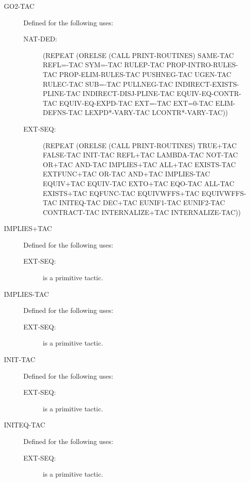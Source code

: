 \begin{description}
\begin{description}
\end{description}

\item[GO2-TAC]  Defined for the following uses:
\begin{description}
\item[NAT-DED:] 
(REPEAT
 (ORELSE (CALL PRINT-ROUTINES) SAME-TAC REFL=-TAC SYM=-TAC RULEP-TAC
  PROP-INTRO-RULES-TAC PROP-ELIM-RULES-TAC PUSHNEG-TAC UGEN-TAC
  RULEC-TAC SUB=-TAC PULLNEG-TAC INDIRECT-EXISTS-PLINE-TAC
  INDIRECT-DISJ-PLINE-TAC EQUIV-EQ-CONTR-TAC EQUIV-EQ-EXPD-TAC EXT=-TAC
  EXT=0-TAC ELIM-DEFNS-TAC LEXPD*-VARY-TAC LCONTR*-VARY-TAC))


\item[EXT-SEQ:] 
(REPEAT
 (ORELSE (CALL PRINT-ROUTINES) TRUE+TAC FALSE-TAC INIT-TAC REFL+TAC
  LAMBDA-TAC NOT-TAC OR+TAC AND-TAC IMPLIES+TAC ALL+TAC EXISTS-TAC
  EXTFUNC+TAC OR-TAC AND+TAC IMPLIES-TAC EQUIV+TAC EQUIV-TAC EXTO+TAC
  EQO-TAC ALL-TAC EXISTS+TAC EQFUNC-TAC EQUIVWFFS+TAC EQUIVWFFS-TAC
  INITEQ-TAC DEC+TAC EUNIF1-TAC EUNIF2-TAC CONTRACT-TAC INTERNALIZE+TAC
  INTERNALIZE-TAC))


\end{description}

\item[IMPLIES+TAC]  Defined for the following uses:
\begin{description}
\item[EXT-SEQ:]  is a primitive tactic.

\end{description}

\item[IMPLIES-TAC]  Defined for the following uses:
\begin{description}
\item[EXT-SEQ:]  is a primitive tactic.

\end{description}

\item[INIT-TAC]  Defined for the following uses:
\begin{description}
\item[EXT-SEQ:]  is a primitive tactic.

\end{description}

\item[INITEQ-TAC]  Defined for the following uses:
\begin{description}
\item[EXT-SEQ:]  is a primitive tactic.


\end{description}
\end{description}
